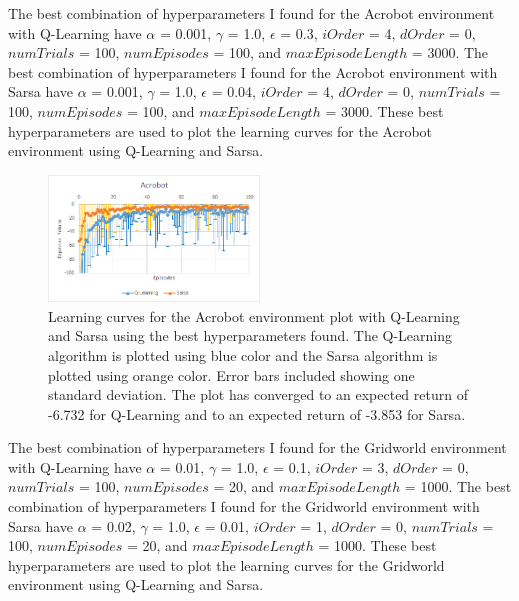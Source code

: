 \documentclass[]{article}
\begin{document}
\begin{enumerate}
{The best combination of hyperparameters I found for the Acrobot environment with Q-Learning have $\alpha$ = 0.001, $\gamma$ = 1.0, $\epsilon$ = 0.3, $iOrder$ = 4, $dOrder$ =  0, $numTrials$ = 100, $numEpisodes$ = 100, and $maxEpisodeLength$ = 3000.
The best combination of hyperparameters I found for the Acrobot environment with Sarsa have $\alpha$ = 0.001, $\gamma$ = 1.0, $\epsilon$ = 0.04, $iOrder$ = 4, $dOrder$ =  0, $numTrials$ = 100, $numEpisodes$ = 100, and $maxEpisodeLength$ = 3000.
These best hyperparameters are used to plot the learning curves for the Acrobot environment using Q-Learning and Sarsa.
		
		\begin{figure}[H]
		    \centering
		    \includegraphics[width=0.5\textwidth]{Acrobot.png}
		    \caption{Learning curves for the Acrobot environment plot with Q-Learning and Sarsa using the best hyperparameters found. The Q-Learning algorithm is plotted using blue color and the Sarsa algorithm is plotted using orange color. Error bars included showing one standard deviation. The plot has converged to an expected return of -6.732 for Q-Learning and to an expected return of -3.853 for Sarsa.}
		    \label{fig: Acrobot environment plot with Q-Learning and Sarsa}
		\end{figure}

The best combination of hyperparameters I found for the Gridworld environment with Q-Learning have $\alpha$ = 0.01, $\gamma$ = 1.0, $\epsilon$ = 0.1, $iOrder$ = 3, $dOrder$ =  0, $numTrials$ = 100, $numEpisodes$ = 20, and $maxEpisodeLength$ = 1000.
The best combination of hyperparameters I found for the Gridworld environment with Sarsa have $\alpha$ = 0.02, $\gamma$ = 1.0, $\epsilon$ = 0.01, $iOrder$ = 1, $dOrder$ =  0, $numTrials$ = 100, $numEpisodes$ = 20, and $maxEpisodeLength$ = 1000.
These best hyperparameters are used to plot the learning curves for the Gridworld environment using Q-Learning and Sarsa.
		
}
\end{enumerate}
\end{document}
